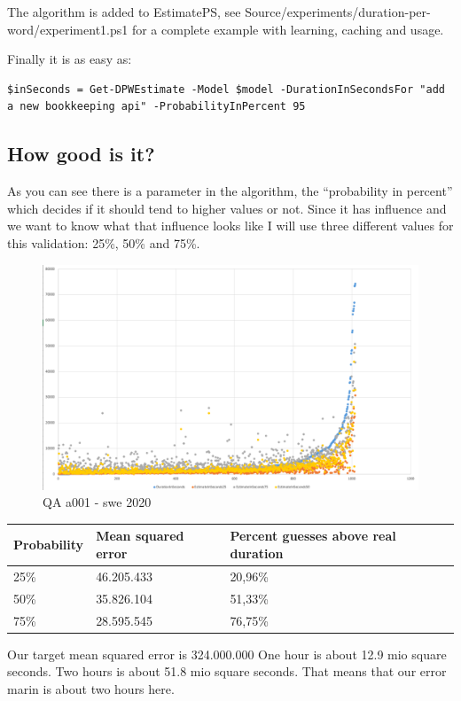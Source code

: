 The algorithm is added to EstimatePS, see
Source/experiments/duration-per-word/experiment1.ps1 for a complete
example with learning, caching and usage.

Finally it is as easy as:

\begin{verbatim}
$inSeconds = Get-DPWEstimate -Model $model -DurationInSecondsFor "add a new bookkeeping api" -ProbabilityInPercent 95
\end{verbatim}

\hypertarget{how-good-is-it}{%
\subsection{How good is it?}\label{how-good-is-it}}

As you can see there is a parameter in the algorithm, the ``probability
in percent'' which decides if it should tend to higher values or not.
Since it has influence and we want to know what that influence looks
like I will use three different values for this validation: 25\%, 50\%
and 75\%.

\begin{figure}
\centering
\includegraphics{Documentation/10000-A001/a001-swe2020.png}
\caption{QA a001 - swe 2020}
\end{figure}

\begin{longtable}[]{@{}lll@{}}
\toprule
Probability & Mean squared error & Percent guesses above real
duration\tabularnewline
\midrule
\endhead
25\% & 46.205.433 & 20,96\%\tabularnewline
50\% & 35.826.104 & 51,33\%\tabularnewline
75\% & 28.595.545 & 76,75\%\tabularnewline
\bottomrule
\end{longtable}

Our target mean squared error is 324.000.000 One hour is about 12.9 mio
square seconds. Two hours is about 51.8 mio square seconds. That means
that our error marin is about two hours here.

